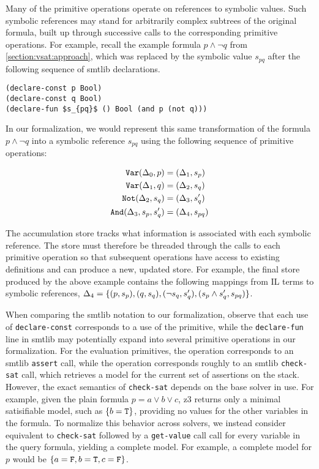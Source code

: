 Many of the primitive operations operate on references to symbolic values. Such
symbolic references may stand for arbitrarily complex subtrees of the original
formula, built up through successive calls to the corresponding primitive
operations.
%
For example, recall the example formula $p\wedge\neg q$ from
\autoref{section:vsat:approach}, which was replaced by the symbolic value $s_{pq}$ after
the following sequence of \acs{smtlib} declarations.
%
\begin{lstlisting}[columns=flexible,keepspaces=true,language=SMTLIB]
(declare-const p Bool)
(declare-const q Bool)
(declare-fun $s_{pq}$ () Bool (and p (not q)))
\end{lstlisting}
%
In our formalization, we would represent this same transformation of the
formula $p\wedge\neg q$ into a symbolic reference $s_{pq}$ using the
following sequence of primitive operations:

\vspace{-2ex}
{\footnotesize
\begin{align*}
\texttt{Var}(\Delta_{0}, p)       &= (\Delta_{1}, s_p) \\
\texttt{Var}(\Delta_{1}, q)       &= (\Delta_{2}, s_q) \\
\texttt{Not}(\Delta_{2}, s_q)       &= (\Delta_{3}, s_q') \\
\texttt{And}(\Delta_{3}, s_p, s_q') &= (\Delta_{4}, s_{pq})
\end{align*}}%

\noindent
%
The accumulation store tracks what information is associated with each symbolic
reference. The store must therefore be threaded through the calls to each
primitive operation so that subsequent operations have access to existing
definitions and can produce a new, updated store.
%
For example, the final store produced by the above example contains the
following mappings from IL terms to symbolic references,
$\aStore{4}=\set{(p,s_p),(q,s_q),(\neg s_q,s_q'),(s_p\wedge s_q',s_{pq})}$.


When comparing the \acs{smtlib} notation to our formalization, observe that
each use of \lstinline{declare-const} corresponds to a use of the \pspawn{}
primitive, while the \lstinline{declare-fun} line in \acs{smtlib} may
potentially expand into several primitive operations in our formalization.
%
For the evaluation primitives, the \passert{} operation corresponds to an
\acs{smtlib} \lstinline{assert} call, while the \pmodel{} operation corresponds
roughly to an \acs{smtlib} \lstinline{check-sat} call, which retrieves a model
for the current set of assertions on the stack.
%
However, the exact semantics of \lstinline{check-sat} depends on the base
solver in use. For example, given the plain formula $p = a \vee b \vee c$, z3
returns only a minimal satisifiable model, such as $\{b = \texttt{T}{}\}$, providing
no values for the other variables in the formula.
%
To normalize this behavior across solvers, we instead consider \pmodel{}
equivalent to \lstinline{check-sat} followed by a \lstinline{get-value} call
call for every variable in the query formula, yielding a complete model. For
example, a complete model for $p$ would be $\set{a=\fls{}, b=\tru{},
c=\fls{}}$.


